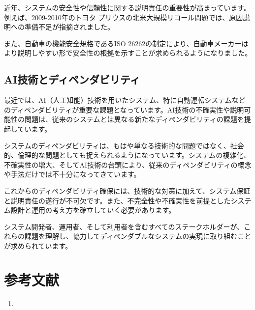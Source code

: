 近年、システムの安全性や信頼性に関する説明責任の重要性が高まっています。例えば、2009-2010年のトヨタ プリウスの北米大規模リコール問題では、原因説明への準備不足が指摘されました。

また、自動車の機能安全規格であるISO 26262の制定により、自動車メーカーはより説明しやすい形で安全性の根拠を示すことが求められるようになりました。

\subsection{AI技術とディペンダビリティ}

最近では、AI（人工知能）技術を用いたシステム、特に自動運転システムなどのディペンダビリティが重要な課題となっています。AI技術の不確実性や説明可能性の問題は、従来のシステムとは異なる新たなディペンダビリティの課題を提起しています。


システムのディペンダビリティは、もはや単なる技術的な問題ではなく、社会的、倫理的な問題としても捉えられるようになっています。システムの複雑化、不確実性の増大、そしてAI技術の台頭により、従来のディペンダビリティの概念や手法だけでは不十分になってきています。

これからのディペンダビリティ確保には、技術的な対策に加えて、システム保証と説明責任の遂行が不可欠です。また、不完全性や不確実性を前提としたシステム設計と運用の考え方を確立していく必要があります。

システム開発者、運用者、そして利用者を含むすべてのステークホルダーが、これらの課題を理解し、協力してディペンダブルなシステムの実現に取り組むことが求められています。

\section*{参考文献}
\begin{enumerate}
\item 
\end{enumerate}

